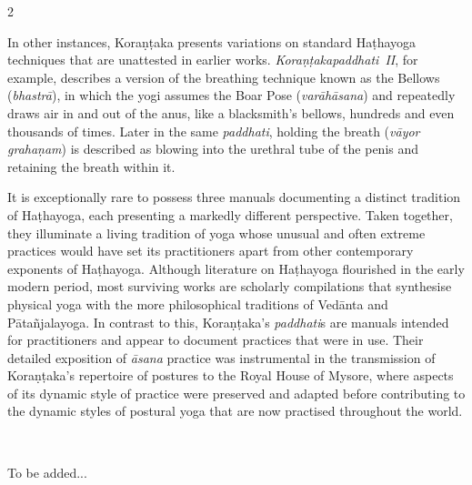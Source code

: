 \begin{nohyp}
\begin{multicols*}{2}
\begin{eng}
In other instances, Koraṇṭaka presents variations on standard Haṭhayoga techniques that are unattested in earlier works. \emph{Koraṇṭakapaddhati}~\emph{II}, for example, describes a version of the breathing technique known as the Bellows (\emph{bhastrā}), in which the yogi assumes the Boar Pose (\emph{varāhāsana}) and repeatedly draws air in and out of the anus, like a blacksmith's bellows, hundreds and even thousands of times. Later in the same \emph{paddhati}, holding the breath (\emph{vāyor grahaṇam}) is described as blowing into the urethral tube of the penis and retaining the breath within it.

It is exceptionally rare to possess three manuals documenting a distinct tradition of Haṭhayoga, each presenting a markedly different perspective. Taken together, they illuminate a living tradition of yoga whose unusual and often extreme practices would have set its practitioners apart from other contemporary exponents of Haṭhayoga. Although literature on Haṭhayoga flourished in the early modern period, most surviving works are scholarly compilations that synthesise physical yoga with the more philosophical traditions of Vedānta and Pātañjalayoga. In contrast to this, Koraṇṭaka's \emph{paddhati}s are manuals intended for practitioners and appear to document practices that were in use. Their detailed exposition of \emph{āsana} practice was instrumental in the transmission of Koraṇṭaka's repertoire of postures to the Royal House of Mysore, where aspects of its dynamic style of practice were preserved and adapted before contributing to the dynamic styles of postural yoga that are now practised throughout the world.
\end{eng}
\end{multicols*}

\newpage
~\vfill
\begin{eng}
\label{introsec3}
\end{eng}
\vskip 22pt


\begin{eng}
\label{introsec4}
\end{eng}
\vskip 22pt

\centerline{{\small To be added...}}

~\vfill


\newpage

\null\vskip 0.1cm
\begin{eng}
\setcounter{section}{4}
\label{introsec5}
\end{eng}
\vskip 22pt


\end{nohyp}
